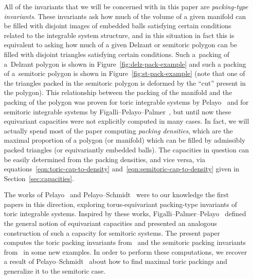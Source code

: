 \documentclass[pdftex]{sigma}
\numberwithin{equation}{section}
\begin{document}
All of the invariants that we will be concerned with in this paper are \emph{packing-type invariants}. These invariants ask how much of the volume of a given manifold can be filled with disjoint images of embedded balls satisfying certain conditions related to the integrable system structure, and in this situation in fact this is equivalent to asking how much of a given Delzant or semitoric polygon can be filled with disjoint triangles satisfying certain conditions.
Such
a~packing of a~Delzant polygon is shown in Figure~\ref{fig:delz-pack-example} and such a packing of a~semitoric polygon is shown in Figure~\ref{fig:st-pack-example} (note that one of the triangles packed in the semitoric polygon is deformed by the ``cut'' present in the polygon).
This relationship between the packing of the manifold and the packing of the polygon was proven for toric integrable systems by Pelayo~\cite{Pe2006} and for semitoric integrable systems by Figalli--Pelayo--Palmer~\cite{FiPaPe2016}, but until now these equivariant capacities were not explicitly computed in many cases.
In fact, we will actually spend most of the paper computing \emph{packing densities}, which are the maximal proportion of a polygon (or manifold) which can be filled by admissibly packed triangles (or equivariantly embedded balls).
The capacities in question can be easily determined from the packing densities, and vice versa, via equations~\eqref{eqn:toric-cap-to-density} and~\eqref{eqn:semitoric-cap-to-density} given in Section~\ref{sec:capacities}.

The works of Pelayo~\cite{Pe2006, Pe2007} and Pelayo--Schmidt~\cite{PeSc2008} were to our knowledge the first papers in this direction, exploring torus-equivariant packing-type invariants of toric integrable systems. Inspired by these works, Figalli--Palmer--Pelayo~\cite{FiPaPe2016} defined the general notion of equivariant capacities and presented an analogous construction of such a capacity for semitoric systems. The present paper computes the toric packing invariants from~\cite{Pe2006, Pe2007, PeSc2008} and the semitoric packing invariants from~\cite{FiPaPe2016} in some new examples.
In order to perform these computations, we recover a result of Pelayo--Schmidt~\cite{PeSc2008} about how to find maximal toric packings and generalize it to the semitoric case.
\end{document}
